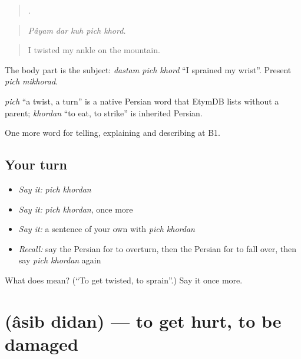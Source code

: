 \begin{quote}
    .
\end{quote}

\begin{quote}
\emph{Pâyam dar kuh pich khord.}
\end{quote}

\begin{quote}
I twisted my ankle on the mountain.
\end{quote}

The body part is the subject: \emph{dastam pich khord} \textquotedblleft{}I sprained my wrist\textquotedblright{}. Present \emph{pich mikhorad}.

\begin{cousinweb}
\emph{pich} \textquotedblleft{}a twist, a turn\textquotedblright{} is a native Persian word that EtymDB lists without a parent; \emph{khordan} \textquotedblleft{}to eat, to strike\textquotedblright{} is inherited Persian.
\end{cousinweb}

\begin{grammarlens}[title={What you've built}]
One more word for telling, explaining and describing at B1.
\end{grammarlens}

\subsection*{Your turn}
\begin{itemize}
\raggedright
  \item \emph{Say it:} \emph{pich khordan}
  \item \emph{Say it:} \emph{pich khordan}, once more
  \item \emph{Say it:} a sentence of your own with \emph{pich khordan}
  \item \emph{Recall:} say the Persian for to overturn, then the Persian for to fall over, then say \emph{pich khordan} again
\end{itemize}

\begin{tcolorbox}[breakable,colback=teal!4,colframe=teal!35!black,title={Before you move on}]
What does   mean? (\textquotedblleft{}To get twisted, to sprain\textquotedblright{}.) Say it once more.
\end{tcolorbox}
\section[\texorpdfstring{\fa{آسیب} \fa{دیدن} (âsib didan)}{آسیب دیدن (âsib didan)}]{  (âsib didan) — to get hurt, to be damaged}

